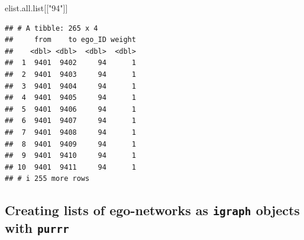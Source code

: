 \documentclass[
]{book}
\newenvironment{Shaded}{\begin{snugshade}}{\end{snugshade}}
\newcommand{\NormalTok}[1]{#1}
\newcommand{\StringTok}[1]{\textcolor[rgb]{0.31,0.60,0.02}{#1}}
\begin{document}
\begin{Shaded}
\begin{Highlighting}[]
\NormalTok{elist.all.list[[}\StringTok{"94"}\NormalTok{]]}
\end{Highlighting}
\end{Shaded}

\begin{verbatim}
## # A tibble: 265 x 4
##     from    to ego_ID weight
##    <dbl> <dbl>  <dbl>  <dbl>
##  1  9401  9402     94      1
##  2  9401  9403     94      1
##  3  9401  9404     94      1
##  4  9401  9405     94      1
##  5  9401  9406     94      1
##  6  9401  9407     94      1
##  7  9401  9408     94      1
##  8  9401  9409     94      1
##  9  9401  9410     94      1
## 10  9401  9411     94      1
## # i 255 more rows
\end{verbatim}

\hypertarget{creating-lists-of-ego-networks-as-igraph-objects-with-purrr}{%
\subsection{\texorpdfstring{Creating lists of ego-networks as \texttt{igraph} objects with \texttt{purrr}}{Creating lists of ego-networks as igraph objects with purrr}}\label{creating-lists-of-ego-networks-as-igraph-objects-with-purrr}}
\end{document}
